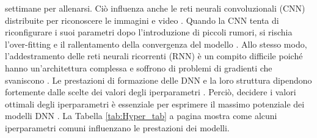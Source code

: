 settimane per allenarsi. Ciò influenza anche le reti neurali convoluzionali (CNN) distribuite per riconoscere le
immagini e video \cite{pmlr-v9-glorot10a}.
Quando la CNN tenta di riconfigurare i suoi parametri dopo l'introduzione di piccoli rumori, si rischia 
l'over-fitting e il rallentamento della convergenza del modello \cite{7536654}. Allo stesso modo, 
l'addestramento delle reti neurali ricorrenti (RNN) è un compito difficile poiché hanno un'architettura 
complessa e soffrono di problemi di gradienti che svaniscono \cite{Pascanu2013}.
Le prestazioni di formazione delle DNN e la loro struttura dipendono fortemente dalle scelte dei valori 
degli iperparametri \cite{Dobslaw2010APF}.
Perciò, decidere i valori ottimali degli iperparametri è essenziale per esprimere il massimo potenziale dei modelli 
DNN \cite{7536654}. 
La Tabella \ref{tab:Hyper_tab} a pagina \pageref{tab:Hyper_tab} mostra come alcuni iperparametri comuni influenzano le prestazioni dei modelli.
